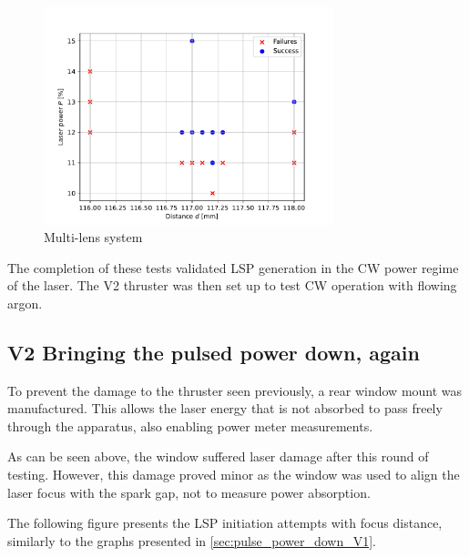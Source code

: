         \begin{figure}[!ht]
            \centering
            \includegraphics[width=0.75\textwidth]{assets/4 experiments/duallens_focus_threshold.pdf}
            \caption{Multi-lens system}
        \end{figure}


        The completion of these tests validated LSP generation in the CW power regime of the laser. The V2 thruster was then set up to test CW operation with flowing argon.

    \subsection{V2 Bringing the pulsed power down, again}

        To prevent the damage to the thruster seen previously, a rear window mount was manufactured. This allows the laser energy that is not absorbed to pass freely through the apparatus, also enabling power meter measurements. 
        

        As can be seen above, the window suffered laser damage after this round of testing. However, this damage proved minor as the window was used to align the laser focus with the spark gap, not to measure power absorption.
        
        The following figure presents the LSP initiation attempts with focus distance, similarly to the graphs presented in \autoref{sec:pulse_power_down_V1}.

